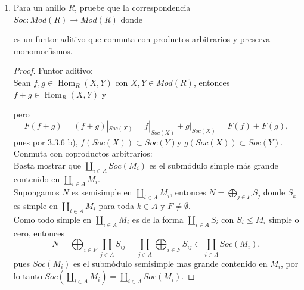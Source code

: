 \documentclass{article}
\begin{document}
\begin{enumerate}[label=\textbf{Ej \arabic*.}]
\begin{proof}
			En resumen, $h:I_{1} \longrightarrow I_{2}$ y $f:I_{1} \longrightarrow I_{1}$ son envolventes inyectivas de $I_{1}$. Por el ejercicio anterior, existe $g:I_{1} \longrightarrow I_{2}$ un isomorfismo en $Mod\lrprth{R}$ tal que $gf=h$. $\therefore h$ es isomorfismo.
		\end{proof}
		
		\item 
		Para un anillo $R$, pruebe que la correspondencia\\ $Soc:Mod(R)\longrightarrow Mod(R)$ donde\\

es un funtor aditivo que conmuta con productos arbitrarios y preserva monomorfismos.
\begin{proof}
Funtor aditivo:\\
Sean $f,g\in  \operatorname{Hom}_R(X,Y)$ con $X,Y\in Mod(R)$, entonces $f+g\in \operatorname{Hom}_R(X,Y)$ y 
pero \[F(f+g)=(f+g)|_{Soc(X)}=f|_{Soc(X)}+g|_{Soc(X)}=F(f)+F(g),
\]
pues por 3.3.6 b), $f(Soc(X))\subset Soc(Y)$\quad y \quad $g(Soc(X))\subset Soc(Y).$\\

Conmuta con coproductos arbitrarios:\\

Basta mostrar que $\displaystyle\coprod_{i\in A}Soc(M_i)$ es el submódulo simple más grande contenido en $\displaystyle\coprod_{i\in A}M_i$.\\
Supongamos $N$ es semisimple en $\displaystyle\coprod_{i\in A}M_i$, entonces $N=\displaystyle\bigoplus_{j\in F}S_j$ donde $S_k$ es simple en
$\displaystyle\coprod_{i\in A}M_i$ para toda $k\in A$ y $F\neq \emptyset$.\\

Como todo simple en $\displaystyle\coprod_{i\in A}M_i$ es de la forma $\displaystyle\coprod_{i\in A}S_i$ con $S_i\leq M_i$ simple o cero, 
entonces
\[
N=\bigoplus_{i\in F}\coprod_{j\in A}S_{ij}=\coprod_{j\in A}\bigoplus_{i\in F}S_{ij}\subset \coprod_{i\in A}Soc(M_i), 
\]
pues $Soc(M_i)$ es el submódulo semisimple mas grande contenido en $M_i$, por lo tanto 
$Soc(\displaystyle\coprod_{i\in A}M_i)=\displaystyle\coprod_{i\in A}Soc(M_i).$


\end{proof}
\end{enumerate}
\end{document}
